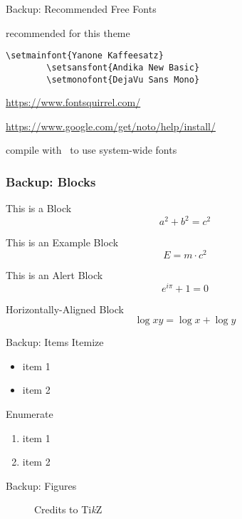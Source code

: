\documentclass[compress,aspectratio=169]{beamer}
\begin{document}
\begin{frame}[fragile]{Backup: Recommended Free Fonts}
  \begin{description}
  \item[Selected Fonts] recommended for this theme\\
    \begin{lstlisting}[basicstyle = \ttfamily\small]
        \setmainfont{Yanone Kaffeesatz}
        \setsansfont{Andika New Basic}
        \setmonofont{DejaVu Sans Mono}
    \end{lstlisting}
  \item[Download] {\small \url{https://www.fontsquirrel.com/}}
  \item[Install Fonts] {\small \url{https://www.google.com/get/noto/help/install/}}
  \item[Compilation] compile with \XeLaTeX~to use system-wide fonts
  \end{description}

\end{frame}

\begin{frame}
  \frametitle{Backup: Blocks}
  \begin{block}{This is a Block}
    \[
      a^2 + b^2 = c^2
    \]
  \end{block}
  \begin{exampleblock}{This is an Example Block}
    \[
      E = m \cdot c^{2}
    \]
  \end{exampleblock}
  \begin{alertblock}{This is an Alert Block}
    \[
      e^{i\pi} + 1 = 0
    \]
  \end{alertblock}

  \centering
  \begin{minipage}{1.0\linewidth}
    \begin{block}{Horizontally-Aligned Block}
      \[
        \log xy = \log x + \log y
      \]
    \end{block}
  \end{minipage}
\end{frame}

\begin{frame}{Backup: Items}
  Itemize
  \begin{itemize}
    \item item 1
    \item item 2
  \end{itemize}

  \bigskip

  Enumerate
  \begin{enumerate}
    \item item 1
    \item item 2
  \end{enumerate}
\end{frame}

\begin{frame}{Backup: Figures}
  \begin{figure}
    \centering
    \caption{Credits to Ti\textit{k}Z}
  \end{figure}
\end{frame}
\end{document}
